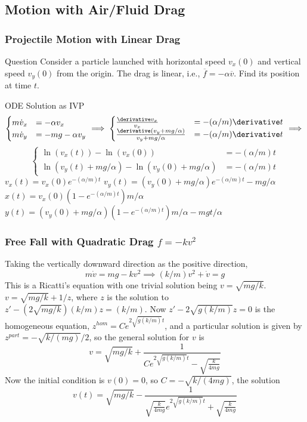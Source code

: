 \subsection{Motion with Air/Fluid Drag}
\begin{frame}
\frametitle{Projectile Motion with Linear Drag}
\begin{block}{Question}
Consider a particle launched with horizontal speed $v_x(0)$ and vertical speed $v_y(0)$ from the origin. The drag is linear, i.e., $\overline{f}=-\alpha \overline{v}$. Find its position at time $t$.
\end{block}
\begin{block}{ODE Solution as IVP}
\[\begin{cases}m\dot v_x&=-\alpha v_x\\m\dot v_y&=-mg-\alpha v_y\end{cases}\implies\begin{cases}\frac{\derivative v_x}{v_x}&=-(\alpha/m)\derivative t\\\frac{\derivative (v_y+mg/\alpha)}{v_y+mg/\alpha}&=-(\alpha/m)\derivative t\end{cases}\implies\]\[\begin{cases}\ln(v_x(t))-\ln(v_x(0))&=-(\alpha/m )t\\\ln(v_y(t)+mg/\alpha)-\ln(v_y(0)+mg/\alpha)&=-(\alpha/m )t\end{cases}\]$v_x(t)=v_x(0)e^{-(\alpha/m) t}$ $v_y(t)=(v_y(0)+mg/\alpha)e^{-(\alpha/m )t}-mg/\alpha$\\$x(t)=v_x(0)(1-e^{-(\alpha/m )t})m/\alpha$  $y(t)=(v_y(0)+mg/\alpha)(1-e^{-(\alpha/m )t})m/\alpha-mgt/\alpha$
\end{block}
\end{frame}
\begin{frame}\label{sliderc3freefallricatti}
\frametitle{Free Fall with Quadratic Drag $f=-kv^2$}
Taking the vertically downward direction as the positive direction,
\[
m\dot v=mg-k v^2\implies (k/m)v^2+\dot v=g
\]
This is a \alert{Ricatti's equation} with one trivial solution being $v=\sqrt{mg/k}$. $v=\sqrt{mg/k}+1/z$, where $z$ is the solution to $z'-(2\sqrt{mg/k})(k/m)z=(k/m)$. Now $z'-2\sqrt{g(k/m)}z=0$ is the homogeneous equation, $z^{hom}=Ce^{2\sqrt{g(k/m)}t}$, and a particular solution is given by $z^{part}=-\sqrt{k/(mg)}/2$, so the general solution for $v$ is \[v=\sqrt{mg/k}+\frac{1}{Ce^{2\sqrt{g(k/m)}t}-\sqrt{\frac{k}{4mg}}}\]
Now the initial condition is $v(0)=0$, so $C=-\sqrt{k/(4mg)}$, the solution
\[v(t)=\sqrt{mg/k}-\frac{1}{\sqrt{\frac{k}{4mg}}e^{2\sqrt{g(k/m)}t}+\sqrt{\frac{k}{4mg}}}\]
\end{frame}
